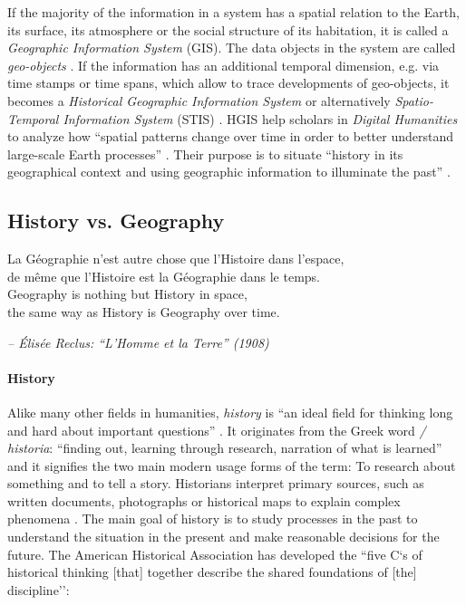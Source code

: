 If the majority of the information in a system has a spatial relation to the Earth, its surface, its atmosphere or the social structure of its habitation, it is called a \emph{Geographic Information System} (GIS). The data objects in the system are called \emph{geo-objects}
\cite{bolstad2008gis}.
If the information has an additional temporal dimension, e.g. via time stamps or time spans, which allow to trace developments of geo-objects, it becomes a \emph{Historical Geographic Information System}
\cite{gregory2014toward}
or alternatively \emph{Spatio-Temporal Information System} (STIS)
\cite{pelekis04stdms}.
HGIS help scholars in \emph{Digital Humanities} to analyze how ``spatial patterns change over time in order to better understand large-scale Earth processes''
\cite{peuquet99}.
Their purpose is to situate ``history in its geographical context and using geographic information to illuminate the past''
\cite{knowles2008placing}.

\subsection{History vs. Geography} %
\label{sub:history_vs_geography}

\begin{quoteit}
La Géographie n’est autre chose que l’Histoire dans l’espace, \\
de même que l’Histoire est la Géographie dans le temps. \\[1.0em]
Geography is nothing but History in space, \\
the same way as History is Geography over time.
\end{quoteit}
\hfill \textit{-- Élisée Reclus: ``L'Homme et la Terre'' (1908)}

\paragraph{History} %
\label{par:history}


Alike many other fields in humanities, \emph{history} is ``an ideal field for thinking long and hard about important questions''
\cite{ahaFiveCs}.
It originates from the Greek word \emph{\textIota\textsigma\texttau\textomikron\textrho\textiota\textalpha / historia}: ``finding out, learning through research, narration of what is learned'' \cite{dict}
and it signifies the two main modern usage forms of the term: To research about something and to tell a story. Historians interpret primary sources, such as written documents, photographs or historical maps to explain complex phenomena \cite[pp.4-7]{knowles2008placing}. The main goal of history is to study processes in the past to understand the situation in the present and make reasonable decisions for the future. The American Historical Association has developed the ``five C`s of historical thinking [that] together describe the shared foundations of [the] discipline''\cite{ahaFiveCs}:

